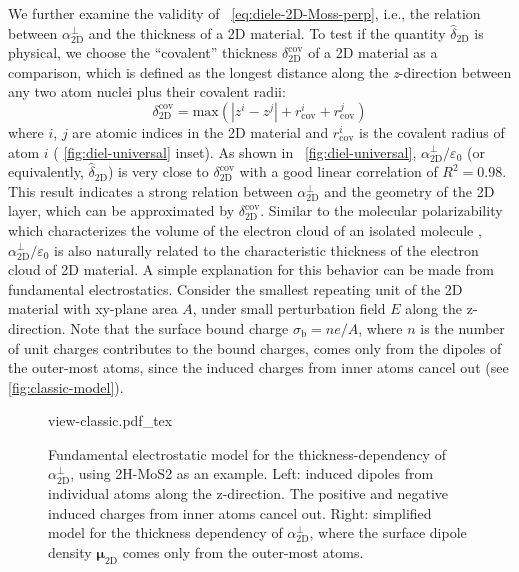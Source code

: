 We further examine the validity of ~\autoref{eq:diele-2D-Moss-perp},
i.e., the relation between $\alpha_{\mathrm{2D}}^{\perp}$ and the
thickness of a 2D material. To test if the quantity
$\hat{\delta}_{\mathrm{2D}}$ is physical, we choose the ``covalent''
thickness $\delta_{\mathrm{2D}}^{\mathrm{cov}}$ of a 2D material as a
comparison, which is defined as the
longest distance along the \textit{z}-direction between any two atom
nuclei plus their covalent radii:
%
%
\begin{equation}
  \label{eq:diele-cov-thick}
  \delta_{\mathrm{2D}}^{\mathrm{cov}} = \mathrm{max}(|z^{i} - z^{j}|
  + r^{i}_{\mathrm{cov}} + r^{j}_{\mathrm{cov}})
\end{equation}
where $i$, $j$ are atomic indices in the 2D material and
$r_{\mathrm{cov}}^{i}$ is the covalent radius of atom $i$ (
\autoref{fig:diel-universal} inset). As shown in
~\autoref{fig:diel-universal},
$\alpha_{\mathrm{2D}}^{\perp}/\varepsilon_{0}$ (or equivalently,
$\hat{\delta}_{\mathrm{2D}}$) is very close to
$\delta_{\mathrm{2D}}^{\mathrm{cov}}$ with a good linear correlation
of $R^{2}=0.98$. This result indicates a strong relation between
$\alpha_{\mathrm{2D}}^{\perp}$ and the geometry of the 2D layer, which
can be approximated by $\delta_{\mathrm{2D}}^{\mathrm{cov}}$. Similar
to the molecular polarizability which characterizes the volume of the
electron cloud of an isolated molecule \autocite{Israelachvili_2011_book},
$\alpha_{\mathrm{2D}}^{\perp}/\varepsilon_{0}$ is also naturally
related to the characteristic thickness of the electron cloud of 2D
material. A simple explanation for this behavior can be made from
fundamental electrostatics. Consider the smallest repeating unit of
the 2D material with xy-plane area $A$, under small perturbation field
$E$ along the z-direction.  Note that the surface bound charge
$\sigma_{\mathrm{b}}=n e /A$, where $n$ is the number of unit charges
contributes to the bound charges, comes only from the dipoles of the
outer-most atoms, since the induced charges from inner atoms cancel
out (see \autoref{fig:classic-model}).
\begin{figure}[htbp]
  \centering
  {view-classic.pdf_tex}
  \caption{Fundamental electrostatic model for the
    thickness-dependency of $\alpha_{\mathrm{2D}}^{\perp}$, using 2H-MoS2 as an
    example. Left: induced dipoles from individual atoms along the
    z-direction. The positive and negative induced charges from inner
    atoms cancel out. Right: simplified model for the thickness
    dependency of $\alpha_{\mathrm{2D}}^{\perp}$, where the surface dipole density $\symbf{\mu}_{\mathrm{2D}}$ comes only from the outer-most atoms.}
  \label{fig:classic-model}
\end{figure}
